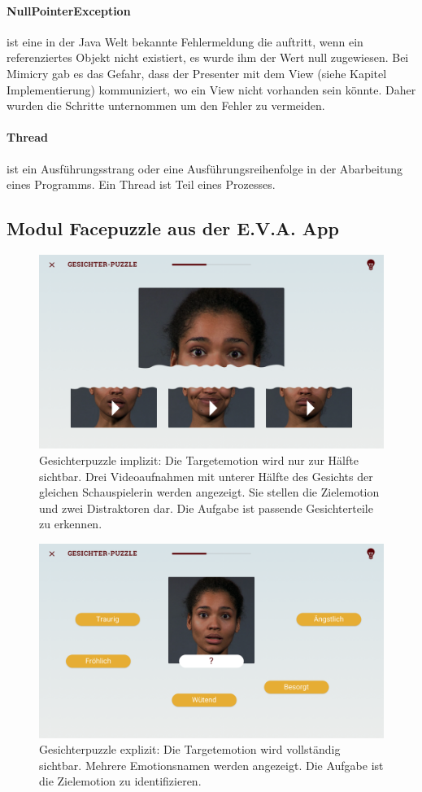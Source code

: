 \paragraph{NullPointerException}ist eine in der Java Welt bekannte Fehlermeldung die auftritt, wenn ein referenziertes Objekt nicht existiert, es wurde ihm der Wert null zugewiesen. Bei Mimicry gab es das Gefahr, dass der Presenter mit dem View (siehe Kapitel Implementierung) kommuniziert, wo ein View nicht vorhanden sein könnte. Daher wurden die Schritte unternommen um den Fehler zu vermeiden.

\paragraph{Thread}ist ein Ausführungsstrang oder eine Ausführungsreihenfolge in der Abarbeitung eines Programms. Ein Thread ist Teil eines Prozesses.

\newpage
\subsection{Modul Facepuzzle aus der E.V.A. App}
\begin{figure}[!ht]
    \centering
    \includegraphics[width=330pt]{res/facepuzzle_implicite.png}
\caption{Gesichterpuzzle implizit: Die Targetemotion wird nur zur Hälfte sichtbar. Drei Videoaufnahmen mit unterer Hälfte des Gesichts der gleichen Schauspielerin werden angezeigt. Sie stellen die Zielemotion und zwei Distraktoren dar. Die Aufgabe ist passende Gesichterteile zu erkennen.}
\label{facepuzzle_implicite}
\end{figure}

\begin{figure}[!ht]
    \centering\includegraphics[width=330pt]{res/facepuzzle_explicite.PNG}
\caption{Gesichterpuzzle explizit: Die Targetemotion wird vollständig sichtbar. Mehrere Emotionsnamen werden angezeigt. Die Aufgabe ist die Zielemotion zu identifizieren.}
\label{facepuzzle_explicite}
\end{figure}
